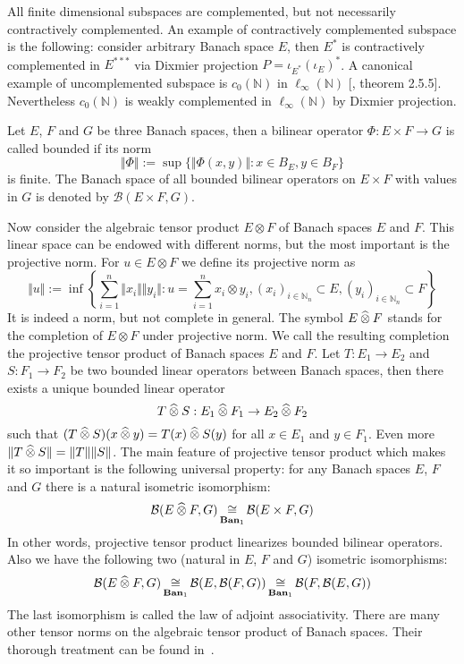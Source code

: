 All finite dimensional subspaces are complemented, but not necessarily
contractively complemented. An example of contractively complemented subspace is
the following: consider arbitrary Banach space $E$, then $E^*$ is contractively
complemented in $E^{***}$ via Dixmier projection $P=\iota_{E^*}{(\iota_E)}^*$. A
canonical example of uncomplemented subspace is $c_0(\mathbb{N})$ in
$\mathbb{\ell_\infty}(\mathbb{N})$ [\cite{KalAlbTopicsBanSpTh}, theorem 2.5.5].
Nevertheless $c_0(\mathbb{N})$ is weakly complemented in
$\ell_\infty(\mathbb{N})$ by Dixmier projection.

Let $E$, $F$ and $G$ be three Banach spaces, then a bilinear operator
$\Phi:E\times F\to G$ is called bounded if its norm 
$$
\Vert \Phi\Vert:=\sup \{\Vert \Phi(x,y)\Vert:x\in B_E, y\in B_F \}
$$ 
is finite. 
The Banach space of all bounded bilinear operators on $E\times F$ with 
values in $G$ is denoted by $\mathcal{B}(E\times F,G)$.

Now consider the algebraic tensor product $E\otimes F$ of Banach spaces $E$ and
$F$. This linear space can be endowed with different norms, but the most
important is the projective norm. For $u\in E\otimes F$ we define its projective
norm as
$$
\Vert u\Vert
:=\inf\left \{
  \sum_{i=1}^n \Vert x_i\Vert\Vert y_i\Vert
  :u=\sum_{i=1}^n x_i\otimes y_i, 
  {(x_i)}_{i\in\mathbb{N}_n}\subset E, 
  {(y_i)}_{i\in\mathbb{N}_n}\subset F
\right \}
$$
It is indeed a norm, but not complete in general. The symbol $E\mathbin{\widehat{\otimes}} F$
stands for the completion of $E\otimes F$ under projective norm. We call the
resulting completion the projective tensor product of Banach spaces $E$ and $F$.
Let $T:E_1\to E_2$ and $S:F_1\to F_2$ be two bounded linear operators between
Banach spaces, then there exists a unique bounded linear operator 
$$
T\mathbin{\widehat{\otimes}} S:E_1\mathbin{\widehat{\otimes}} F_1\to E_2\mathbin{\widehat{\otimes}} F_2
$$ 
such that  $(T\mathbin{\widehat{\otimes}} S)(x\mathbin{\widehat{\otimes}} y)=T(x)\mathbin{\widehat{\otimes}} S(y)$ 
for all $x\in E_1$ and $y\in F_1$. 
Even more $\Vert T\mathbin{\widehat{\otimes}} S\Vert=\Vert T\Vert\Vert S\Vert$. 
The main feature of projective
tensor product which makes it so important is the following universal property:
for any Banach spaces $E$, $F$ and $G$ there is a natural isometric isomorphism:
$$
\mathcal{B}(E\mathbin{\widehat{\otimes}} F,G)\mathop{\mathbin{\cong}}\limits_{\mathbf{Ban}_1}\mathcal{B}(E\times F,G)
$$
In other words, projective tensor product linearizes bounded bilinear operators.
Also we have the following two (natural in $E$, $F$ and $G$) isometric
isomorphisms:
$$
\mathcal{B}(E\mathbin{\widehat{\otimes}} F,G)
\mathop{\mathbin{\cong}}\limits_{\mathbf{Ban}_1}\mathcal{B}(E,\mathcal{B}(F,G))
\mathop{\mathbin{\cong}}\limits_{\mathbf{Ban}_1}\mathcal{B}(F,\mathcal{B}(E,G))
$$
The last isomorphism is called the law of adjoint associativity. There are many
other tensor norms on the algebraic tensor product of Banach spaces. Their
thorough treatment can be found in~\cite{DiestMetTheoryOfTensProd}.

